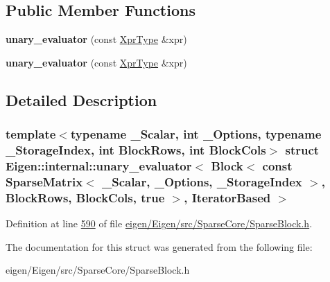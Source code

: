 \subsection*{Public Member Functions}
\begin{DoxyCompactItemize}
\item 
\mbox{\label{struct_eigen_1_1internal_1_1unary__evaluator_3_01_block_3_01const_01_sparse_matrix_3_01___scalarcdbc8f3eebef46901de7cc88abb0e702_a185bbd4feda5782880d651cba8fa199c}} 
{\bfseries unary\+\_\+evaluator} (const \hyperlink{group___core___module_class_eigen_1_1_block}{Xpr\+Type} \&xpr)
\item 
\mbox{\label{struct_eigen_1_1internal_1_1unary__evaluator_3_01_block_3_01const_01_sparse_matrix_3_01___scalarcdbc8f3eebef46901de7cc88abb0e702_a185bbd4feda5782880d651cba8fa199c}} 
{\bfseries unary\+\_\+evaluator} (const \hyperlink{group___core___module_class_eigen_1_1_block}{Xpr\+Type} \&xpr)
\end{DoxyCompactItemize}


\subsection{Detailed Description}
\subsubsection*{template$<$typename \+\_\+\+Scalar, int \+\_\+\+Options, typename \+\_\+\+Storage\+Index, int Block\+Rows, int Block\+Cols$>$\newline
struct Eigen\+::internal\+::unary\+\_\+evaluator$<$ Block$<$ const Sparse\+Matrix$<$ \+\_\+\+Scalar, \+\_\+\+Options, \+\_\+\+Storage\+Index $>$, Block\+Rows, Block\+Cols, true $>$, Iterator\+Based $>$}



Definition at line \hyperlink{eigen_2_eigen_2src_2_sparse_core_2_sparse_block_8h_source_l00590}{590} of file \hyperlink{eigen_2_eigen_2src_2_sparse_core_2_sparse_block_8h_source}{eigen/\+Eigen/src/\+Sparse\+Core/\+Sparse\+Block.\+h}.



The documentation for this struct was generated from the following file\+:\begin{DoxyCompactItemize}
\item 
eigen/\+Eigen/src/\+Sparse\+Core/\+Sparse\+Block.\+h\end{DoxyCompactItemize}
